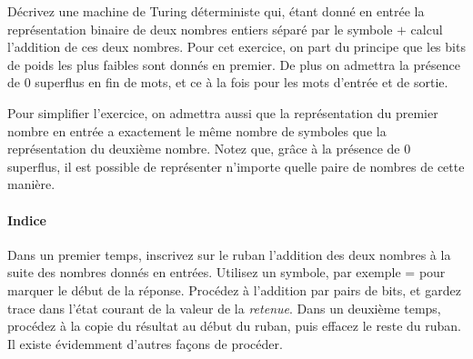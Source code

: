 \documentclass[12pt,french,a4paper]{article}
\begin{document}
\begin{question}
Décrivez une machine de Turing déterministe qui, étant donné en entrée la représentation binaire de deux nombres entiers séparé par le symbole $\texttt{+}$ calcul l'addition de ces deux nombres. Pour cet exercice, on part du principe que les bits de poids les plus faibles sont donnés en premier. De plus on admettra la présence de $0$ superflus en fin de mots, et ce à la fois pour les mots d'entrée et de sortie.

Pour simplifier l'exercice, on admettra aussi que la représentation du premier nombre en entrée a exactement le même nombre de symboles que la représentation du deuxième nombre.
Notez que, grâce à la présence de $0$ superflus, il est possible de représenter n'importe quelle paire de nombres de cette manière.

\paragraph{Indice} Dans un premier temps, inscrivez sur le ruban l'addition des deux nombres à la suite des nombres donnés en entrées. Utilisez un symbole, par exemple $\texttt{=}$ pour marquer le début de la réponse. 
Procédez à l'addition par pairs de bits, et gardez trace dans l'état courant de la valeur de la \textit{retenue}.
Dans un deuxième temps, procédez à la copie du résultat au début du ruban, puis effacez le reste du ruban.
Il existe évidemment d'autres façons de procéder.
\end{question}
\end{document}
